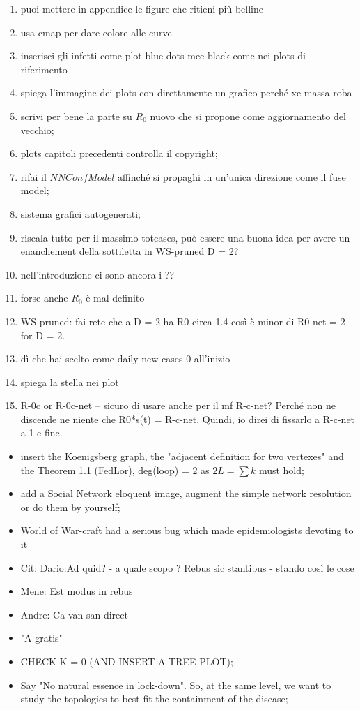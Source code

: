 \documentclass[a4paper,10pt,twoside]{book} %
\theoremstyle{definition}
\begin{document}
\begin{enumerate}
	\item puoi mettere in appendice le figure che ritieni più belline
	\item usa cmap per dare colore alle curve
	\item inserisci gli infetti come plot blue dots mec black come nei plots di riferimento
	\item spiega l'immagine dei plots con direttamente un grafico perché xe massa roba 
	\item scrivi per bene la parte su $R_0$ nuovo che si propone come aggiornamento del vecchio;
	\item plots capitoli precedenti controlla il copyright;
	\item rifai il $NN Conf Model$ affinché si propaghi in un'unica direzione come il fuse model;
	\item sistema grafici autogenerati;
	\item riscala tutto per il massimo totcases, può essere una buona idea per avere un enanchement della sottiletta in WS-pruned D = 2?
	\item nell'introduzione ci sono ancora i ??
	\item forse anche $R_0$ è mal definito 
	\item WS-pruned: fai rete che a D = 2 ha R0 circa 1.4 così è minor di R0-net = 2 for D = 2.
	\item dì che hai scelto come daily new cases 0 all'inizio
	\item spiega la stella nei plot
	\item R-0c or R-0c-net -- sicuro di usare anche per il mf R-c-net? Perché non ne discende ne niente che R0*s(t) = R-c-net. Quindi, io direi di fissarlo a R-c-net a 1 e fine.
\end{enumerate}
\begin{itemize}	
	\item insert the Koenigsberg graph, the "adjacent definition for two vertexes" and the Theorem 1.1 (FedLor), deg(loop) = 2 as $2L = \sum k$ must hold;
	\item add a Social Network eloquent image, augment the simple network resolution or do them by yourself;
	\item World of War-craft had a serious bug which made epidemiologists devoting to it
	\item Cit: Dario:Ad quid? - a quale scopo ?	Rebus sic stantibus - stando così le cose
	\item Mene: Est modus in rebus
	\item Andre: Ca van san direct
	\item "A gratis"
	\item CHECK K = 0 (AND INSERT A TREE PLOT);
	\item Say "No natural essence in lock-down". So, at the same level, we want to study the topologies to best fit the containment of the disease;
\end{itemize}
\end{document}
